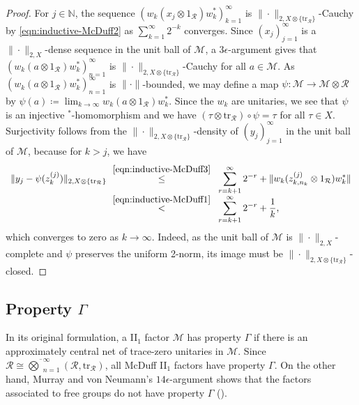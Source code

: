 \documentclass[a4paper,11pt]{amsart}
\theoremstyle{definition}
\numberwithin{equation}{section}
\numberwithin{theorem}{section}
\newcommand{\R}{\mathcal R}
\newcommand{\N}{\mathbb N}
\newcommand{\tr}{\mathrm{tr}}
\newcommand{\M}{\mathcal{M}}
\begin{document}
\begin{proof}
For $j \in \N$, the sequence $(w_k (x_j \otimes 1_\R) w_k^*)_{k=1}^\infty$ is $\|\cdot\|_{2,X \otimes \{\tr_\R\}}$-Cauchy by \eqref{eqn:inductive-McDuff2} as $\sum_{k=1}^\infty 2^{-k}$ converges. Since $(x_j)_{j=1}^\infty$ is  a $\|\cdot\|_{2,X}$-dense sequence in the unit ball of $\M$, a $3\epsilon$-argument gives that  $(w_k (a \otimes 1_\R) w_k^*)_{n=1}^\infty$ is $\|\cdot\|_{2,X \otimes \{\tr_\R\}}$-Cauchy for all $a \in \M$. As $(w_k (a \otimes 1_\R) w_k^*)_{n=1}^\infty$ is $\|\cdot\|$-bounded, we may define a map $\psi\colon \M \rightarrow \M \otimes \R$ by $\psi(a) \coloneqq \lim_{k\to\infty} w_k (a \otimes 1_\R) w_k^*$. Since the $w_k$ are unitaries, we see that $\psi$ is an injective $^*$-homomorphism and we have $(\tau \otimes \tr_{\R}) \circ \psi = \tau$ for all $\tau \in X$. Surjectivity follows from the $\|\cdot\|_{2,X \otimes \{\tr_\R\}}$-density of $(y_j)_{j=1}^\infty$ in the unit ball of $\M$, because for $k > j$, we have
\begin{equation}\begin{array}{rcl}
	\|y_j - \psi(z^{(j)}_k)\|_{2,X \otimes \{\tr_\R\}} \!\! &\stackrel{\eqref{eqn:inductive-McDuff3}}{\leq}& \!\displaystyle\sum_{r=k+1}^\infty 2^{-r} + \|w_k(z^{(j)}_{k,n_k} \otimes 1_{\R})w_k^*\|  \\
	&\stackrel{\eqref{eqn:inductive-McDuff1}}{<}& \!\displaystyle\sum_{r=k+1}^\infty 2^{-r} + \frac{1}{k},
\end{array}\end{equation} 
which converges to zero as $k \to \infty$. Indeed, as the unit ball of $\M$ is \mbox{$\|\cdot\|_{2,X}$}-complete and $\psi$ preserves the uniform 2-norm, its image must be \mbox{$\|\cdot\|_{2,X \otimes \{\tr_\R\}}$}-closed.
\end{proof}

\subsection{Property \texorpdfstring{$\Gamma$}{Gamma}}\label{sec:Gamma}


In its original formulation, a II$_1$ factor $\mathcal M$ has property $\Gamma$ if there is an approximately central net of trace-zero unitaries in $\mathcal M$. Since $\R \cong \overline{\bigotimes}_{n=1}^\infty(\R, \tr_\R)$, all McDuff II$_1$ factors have property $\Gamma$.
On the other hand, Murray and von Neumann's  $14\epsilon$-argument shows that the factors associated to free groups do not have property $\Gamma$ (\cite[Lemma 6.2.1]{MvN43}).
\end{document}
